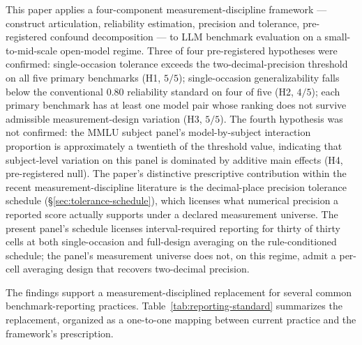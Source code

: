 \documentclass[11pt]{article}
\begin{document}
This paper applies a four-component measurement-discipline framework --- construct articulation, reliability estimation, precision and tolerance, pre-registered confound decomposition --- to LLM benchmark evaluation on a small-to-mid-scale open-model regime. Three of four pre-registered hypotheses were confirmed: single-occasion tolerance exceeds the two-decimal-precision threshold on all five primary benchmarks (H1, $5/5$); single-occasion generalizability falls below the conventional $0.80$ reliability standard on four of five (H2, $4/5$); each primary benchmark has at least one model pair whose ranking does not survive admissible measurement-design variation (H3, $5/5$). The fourth hypothesis was not confirmed: the MMLU subject panel's model-by-subject interaction proportion is approximately a twentieth of the threshold value, indicating that subject-level variation on this panel is dominated by additive main effects (H4, pre-registered null). The paper's distinctive prescriptive contribution within the recent measurement-discipline literature is the decimal-place precision tolerance schedule (§\ref{sec:tolerance-schedule}), which licenses what numerical precision a reported score actually supports under a declared measurement universe. The present panel's schedule licenses interval-required reporting for thirty of thirty cells at both single-occasion and full-design averaging on the rule-conditioned schedule; the panel's measurement universe does not, on this regime, admit a per-cell averaging design that recovers two-decimal precision.

The findings support a measurement-disciplined replacement for several common benchmark-reporting practices. Table~\ref{tab:reporting-standard} summarizes the replacement, organized as a one-to-one mapping between current practice and the framework's prescription.
\end{document}
